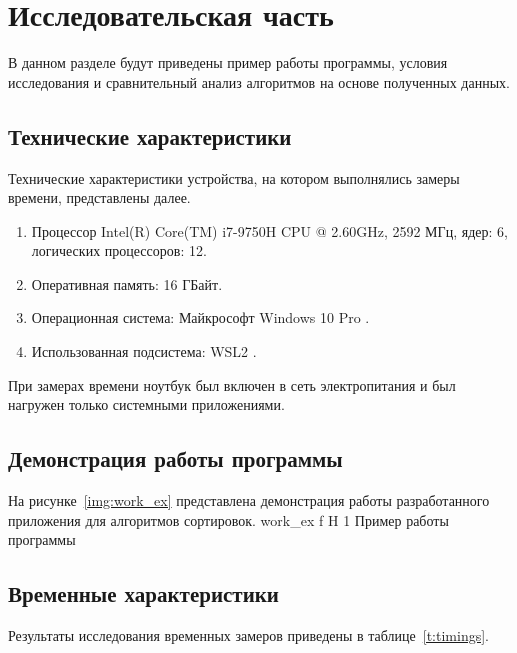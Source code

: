 \chapter{Исследовательская часть}

В данном разделе будут приведены пример работы программы, условия исследования   и сравнительный анализ алгоритмов на основе полученных данных.

\section{Технические характеристики}

Технические характеристики устройства, на котором выполнялись замеры времени, представлены далее.

\begin{enumerate}
	\item Процессор	Intel(R) Core(TM) i7-9750H CPU @ 2.60GHz, 2592 МГц, ядер: 6, логических процессоров: 12.
	\item Оперативная память: 16 ГБайт.
	\item Операционная система: Майкрософт Windows 10 Pro \cite{windows}.
	\item Использованная подсистема: WSL2 \cite{WSL2}.
\end{enumerate}

При замерах времени ноутбук был включен в сеть электропитания и был нагружен только системными приложениями.


\section{Демонстрация работы программы}

На рисунке~\ref{img:work_ex} представлена демонстрация работы разработанного приложения для алгоритмов сортировок.
{work_ex} %
{f} %
{H} %
{1\textwidth} %
{Пример работы программы} %




\section{Временные характеристики}

Результаты исследования временных замеров  приведены в таблице~\ref{t:timings}.

